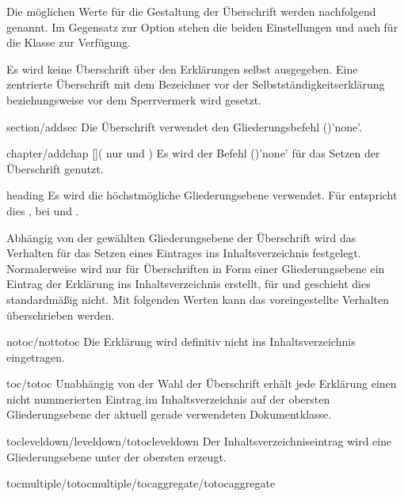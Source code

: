 \begin{Declaration*}{}
\begin{Declaration*}{}
\begin{Declaration*}{}
\begin{Declaration}
Die möglichen Werte für die Gestaltung der Überschrift werden nachfolgend 
genannt. Im Gegensatz zur Option  stehen die beiden 
Einstellungen  und  auch für 
die Klasse  zur Verfügung.
%
\begin{values}{}
\itemfalse
  Es wird keine Überschrift über den Erklärungen selbst ausgegeben.
\itemtrue*
  Eine zentrierte Überschrift mit dem Bezeichner  vor 
  der Selbstständigkeitserklärung beziehungsweise  vor dem 
  Sperrvermerk wird gesetzt. 
\item[section/addsec]
  Die Überschrift verwendet den Gliederungsbefehl 
  ()'none'.
\item[chapter/addchap][\Class{tudscrbook}](%
    nur  und %
  )
  Es wird der Befehl ()'none' für das 
  Setzen der Überschrift genutzt. 
\item[heading]
  Es wird die höchstmögliche Gliederungsebene verwendet. Für 
   entspricht dies , bei 
   und  .
\end{values}
%
Abhängig von der gewählten Gliederungsebene der Überschrift wird das Verhalten 
für das Setzen eines Eintrages ins Inhaltsverzeichnis festgelegt. Normalerweise 
wird nur für Überschriften in Form einer Gliederungsebene ein Eintrag der 
Erklärung ins Inhaltsverzeichnis erstellt, für  und 
 geschieht dies standardmäßig nicht. Mit folgenden 
Werten kann das voreingestellte Verhalten überschrieben werden.
%
\begin{values}{}
\item[notoc/nottotoc]
  Die Erklärung wird definitiv nicht ins Inhaltsverzeichnis eingetragen.
\item[toc/totoc]
  Unabhängig von der Wahl der Überschrift erhält jede Erklärung einen nicht
  nummerierten Eintrag im Inhaltsverzeichnis auf der obersten Gliederungsebene 
  der aktuell gerade verwendeten Dokumentklasse. 
\item[tocleveldown/leveldown/totocleveldown]
  Der Inhaltsverzeichniseintrag wird eine Gliederungsebene unter der obersten 
  erzeugt.
\item[tocmultiple/totocmultiple/tocaggregate/totocaggregate]

\end{values}
\end{Declaration}
\end{Declaration*}
\end{Declaration*}
\end{Declaration*}
